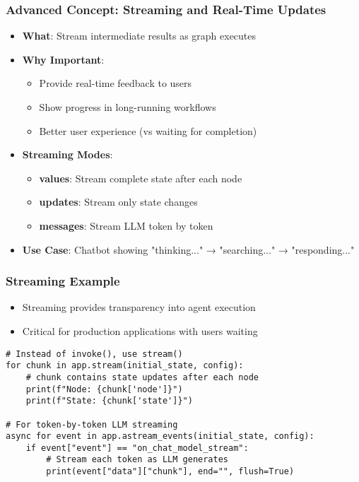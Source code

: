 \begin{frame}[fragile]\frametitle{Advanced Concept: Streaming and Real-Time Updates}
      \begin{itemize}
        \item \textbf{What}: Stream intermediate results as graph executes
        \item \textbf{Why Important}:
        \begin{itemize}
            \item Provide real-time feedback to users
            \item Show progress in long-running workflows
            \item Better user experience (vs waiting for completion)
        \end{itemize}
        \item \textbf{Streaming Modes}:
        \begin{itemize}
            \item \textbf{values}: Stream complete state after each node
            \item \textbf{updates}: Stream only state changes
            \item \textbf{messages}: Stream LLM token by token
        \end{itemize}
        \item \textbf{Use Case}: Chatbot showing "thinking..." → "searching..." → "responding..."
      \end{itemize}
\end{frame}

\begin{frame}[fragile]\frametitle{Streaming Example}

      \begin{itemize}
        \item Streaming provides transparency into agent execution
        \item Critical for production applications with users waiting
      \end{itemize}
	  
\begin{lstlisting}
# Instead of invoke(), use stream()
for chunk in app.stream(initial_state, config):
    # chunk contains state updates after each node
    print(f"Node: {chunk['node']}")
    print(f"State: {chunk['state']}")
    
# For token-by-token LLM streaming
async for event in app.astream_events(initial_state, config):
    if event["event"] == "on_chat_model_stream":
        # Stream each token as LLM generates
        print(event["data"]["chunk"], end="", flush=True)
      \end{lstlisting}
      

\end{frame}

